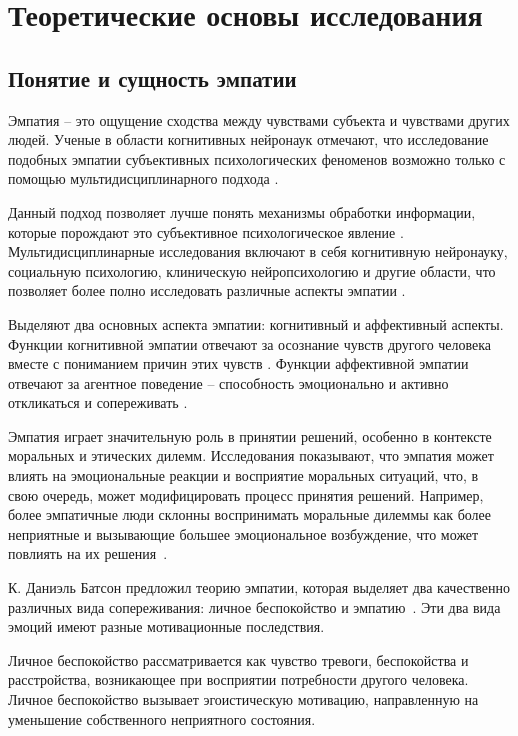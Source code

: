 \chapter{Теоретические основы исследования}
\section{Понятие и сущность эмпатии}
Эмпатия -- это ощущение сходства между чувствами субъекта и чувствами других людей. Ученые в области когнитивных нейронаук отмечают, что исследование подобных эмпатии субъективных психологических феноменов возможно только с помощью мультидисциплинарного подхода \cite{Decety2004}. 

Данный подход позволяет лучше понять механизмы обработки информации, которые порождают это субъективное психологическое явление \cite{Uysal2019}. Мультидисциплинарные исследования включают в себя когнитивную нейронауку, социальную психологию, клиническую нейропсихологию и другие области, что позволяет более полно исследовать различные аспекты эмпатии \cite{Duan2018}.

Выделяют два основных аспекта эмпатии: когнитивный и аффективный аспекты. Функции когнитивной эмпатии отвечают за осознание чувств другого человека вместе с пониманием причин этих чувств \cite{Moscrop2001}. Функции аффективной эмпатии отвечают за агентное поведение -- способность эмоционально и активно откликаться и сопереживать \cite{Kaluzeviciute2020}.

Эмпатия играет значительную роль в принятии решений, особенно в контексте моральных и этических дилемм. Исследования показывают, что эмпатия может влиять на эмоциональные реакции и восприятие моральных ситуаций, что, в свою очередь, может модифицировать процесс принятия решений. Например, более эмпатичные люди склонны воспринимать моральные дилеммы как более неприятные и вызывающие большее эмоциональное возбуждение, что может повлиять на их решения~\cite{Cecchetto2017}. 

К. Даниэль Батсон предложил теорию эмпатии, которая выделяет два качественно различных вида сопереживания: личное беспокойство и эмпатию~\cite{Batson1987}. Эти два вида эмоций имеют разные мотивационные последствия.

Личное беспокойство рассматривается как чувство тревоги, беспокойства и расстройства, возникающее при восприятии потребности другого человека. Личное беспокойство вызывает эгоистическую мотивацию, направленную на уменьшение собственного неприятного состояния.


